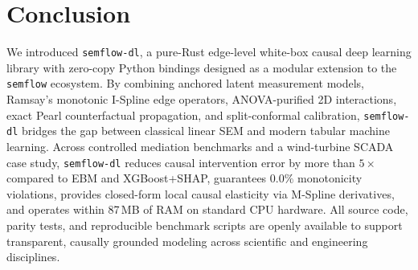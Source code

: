 \section{Conclusion}
\label{sec:conclusion}

We introduced \texttt{semflow-dl}, a pure-Rust edge-level white-box causal deep learning library with zero-copy Python bindings designed as a modular extension to the \texttt{semflow} ecosystem. By combining anchored latent measurement models, Ramsay's monotonic I-Spline edge operators, ANOVA-purified 2D interactions, exact Pearl counterfactual propagation, and split-conformal calibration, \texttt{semflow-dl} bridges the gap between classical linear SEM and modern tabular machine learning. Across controlled mediation benchmarks and a wind-turbine SCADA case study, \texttt{semflow-dl} reduces causal intervention error by more than $5\times$ compared to EBM and XGBoost+SHAP, guarantees $0.0\%$ monotonicity violations, provides closed-form local causal elasticity via M-Spline derivatives, and operates within 87\,MB of RAM on standard CPU hardware. All source code, parity tests, and reproducible benchmark scripts are openly available to support transparent, causally grounded modeling across scientific and engineering disciplines.
